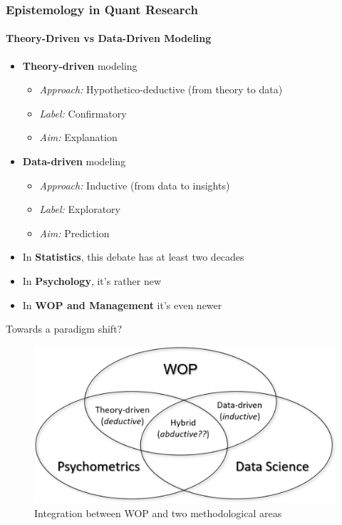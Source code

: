 \documentclass{beamer}
\begin{document}
\begin{frame}
\frametitle{Epistemology in Quant Research}
\framesubtitle{Theory-Driven vs Data-Driven Modeling}
    \begin{itemize}
        \item<1-2>  \textbf{Theory-driven} modeling
            \begin{itemize}
                \item<1-2>  \textit{Approach:} Hypothetico-deductive (from theory to data)
                \item<1-2> \textit{Label:} Confirmatory
                \item<1-2> \textit{Aim:} Explanation
            \end{itemize}
        \item<1-2> \textbf{Data-driven} modeling
            \begin{itemize}
                \item<1-2> \textit{Approach:} Inductive (from data to insights)
                \item<1-2> \textit{Label:} Exploratory
                \item<1-2> \textit{Aim:} Prediction
            \end{itemize}
        \item<2-> In \textbf{Statistics}, this debate has at least two decades\begin{scriptsize}
            \parencite[]{breiman2001, shmueli2010}
        \end{scriptsize}
        \item<2-> In \textbf{Psychology}, it's rather new\begin{scriptsize} \parencite[]{yarkoni2017,jacobucci2022, paxton2017} \end{scriptsize}
        \item<2-> In \textbf{WOP and Management} it's even newer\begin{scriptsize} \parencite[]{leavitt2021, woo2024} \end{scriptsize}
    \end{itemize}
\end{frame}


\begin{frame}{Towards a paradigm shift?}
    \begin{figure}
        \centering
        \includegraphics[width=0.9\linewidth]{figs/wop_psychom_dataScience.png}
        \caption{Integration between WOP and two methodological areas}
        \label{fig:wop_psychom_dataScience}
    \end{figure}
\end{frame}
\end{document}
